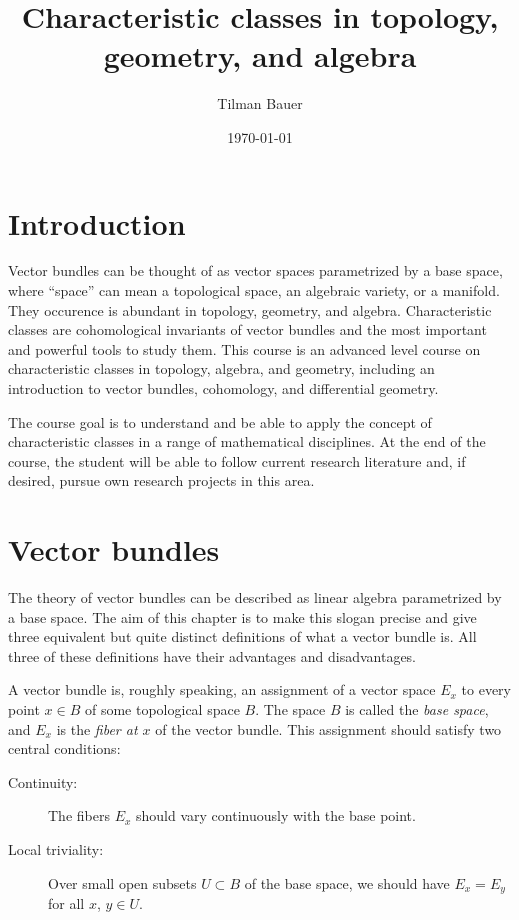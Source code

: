 \documentclass[a4paper,openany]{scrbook}
\title{Characteristic classes in topology, geometry, and algebra}
\author{Tilman Bauer}
\date{\today{}}
\begin{document}
\frontmatter
\maketitle

\mainmatter

\chapter{Introduction}

Vector bundles can be thought of as vector spaces parametrized by a base space, where ``space'' can mean a topological space, an algebraic variety, or a manifold. They occurence is abundant in topology, geometry, and algebra. Characteristic classes are cohomological invariants of vector bundles and the most important and powerful tools to study them. This course is an advanced level course on characteristic classes in topology, algebra, and geometry, including an introduction to vector bundles, cohomology, and differential geometry.

The course goal is to understand and be able to apply the concept of characteristic classes in a range of mathematical disciplines. At the end of the course, the student will be able to follow current research literature and, if desired, pursue own research projects in this area.



\tableofcontents

\chapter{Vector bundles}

The theory of vector bundles can be described as linear algebra parametrized by a base space. The aim of this chapter is to make this slogan precise and give three equivalent but quite distinct definitions of what a vector bundle is. All three of these definitions have their advantages and disadvantages.

A vector bundle is, roughly speaking, an assignment of a vector space $E_x$ to every point $x \in B$ of some topological space $B$. The space $B$ is called the \emph{base space}, and $E_x$ is the \emph{fiber at $x$} of the vector bundle. This assignment should satisfy two central conditions:

\begin{description}
\item[Continuity:] The fibers $E_x$ should vary continuously with the base point.
\item[Local triviality:] Over small open subsets $U \subset B$ of the base space, we should have $E_x = E_y$ for all $x$, $y \in U$.
\end{description}
\end{document}
